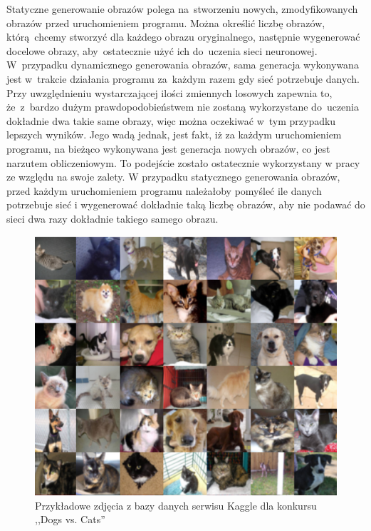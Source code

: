 Statyczne generowanie obrazów polega na~stworzeniu nowych, zmodyfikowanych obrazów przed uruchomieniem programu. Można określić liczbę obrazów, którą~chcemy stworzyć dla każdego obrazu oryginalnego, następnie wygenerować docelowe obrazy, aby~ostatecznie użyć ich do~uczenia sieci neuronowej. W~przypadku dynamicznego generowania obrazów, sama generacja wykonywana jest w~trakcie działania programu za~każdym razem gdy sieć potrzebuje danych. Przy uwzględnieniu wystarczającej ilości zmiennych losowych zapewnia to, że~z~bardzo dużym prawdopodobieństwem nie zostaną wykorzystane do~uczenia dokładnie dwa takie same obrazy, więc można oczekiwać w~tym przypadku lepszych wyników. Jego wadą jednak, jest fakt, iż za każdym uruchomieniem programu, na bieżąco wykonywana jest generacja nowych obrazów, co jest narzutem obliczeniowym. To podejście zostało ostatecznie wykorzystany w pracy ze względu na swoje zalety. W przypadku statycznego generowania obrazów, przed każdym uruchomieniem programu należałoby pomyśleć ile danych potrzebuje sieć i wygenerować dokładnie taką liczbę obrazów, aby nie podawać do sieci dwa razy dokładnie takiego samego obrazu.

\begin{figure}[ht!]
\centering
\includegraphics[scale=0.8]{res/catsdogs.png}
\caption[Caption for LOF]{Przykładowe zdjęcia z bazy danych serwisu Kaggle dla konkursu ,,Dogs vs. Cats'' \label{catsdogs}}
\end{figure} 

